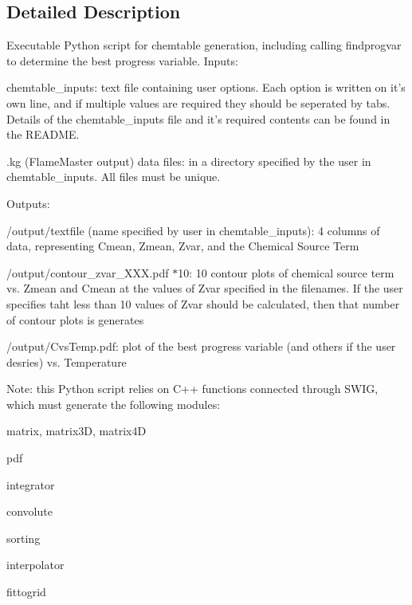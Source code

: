 \subsection{Detailed Description}
Executable Python script for chemtable generation, including calling findprogvar to determine the best progress variable. Inputs:
\begin{DoxyItemize}
\item chemtable\_\-inputs: text file containing user options. Each option is written on it's own line, and if multiple values are required they should be seperated by tabs. Details of the chemtable\_\-inputs file and it's required contents can be found in the README.
\item .kg (FlameMaster output) data files: in a directory specified by the user in chemtable\_\-inputs. All files must be unique.
\end{DoxyItemize}

Outputs:
\begin{DoxyItemize}
\item /output/textfile (name specified by user in chemtable\_\-inputs): 4 columns of data, representing Cmean, Zmean, Zvar, and the Chemical Source Term
\item /output/contour\_\-zvar\_\-XXX.pdf $\ast$10: 10 contour plots of chemical source term vs. Zmean and Cmean at the values of Zvar specified in the filenames. If the user specifies taht less than 10 values of Zvar should be calculated, then that number of contour plots is generates
\item /output/CvsTemp.pdf: plot of the best progress variable (and others if the user desries) vs. Temperature
\end{DoxyItemize}

Note: this Python script relies on C++ functions connected through SWIG, which must generate the following modules:
\begin{DoxyItemize}
\item matrix, matrix3D, matrix4D
\item pdf
\item integrator
\item convolute
\item sorting
\item interpolator
\item fittogrid 
\end{DoxyItemize}